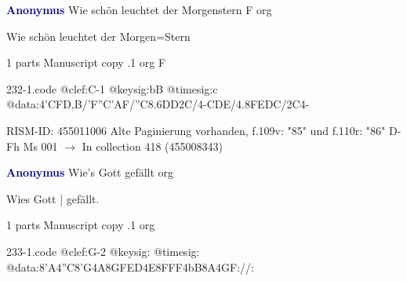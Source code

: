 \documentclass[twocolumn]{book}
\begin{document}
\newline \par \vspace{7pt} \textcolor{darkblue}{\textbf{Anonymus  }}
\newline Wie schön leuchtet der Morgenstern  F  
\newline org
\newline \begin{itshape}[f.109v, heading:] Wie schön leuchtet der Morgen=Stern\end{itshape} 
\newline \textcolor{darkblue}{}  1 parts  
\newline Manuscript copy
.1  org  F  
\begin{filecontents*}{232-1.code}
@clef:C-1
@keysig:bB
@timesig:c
@data:4'CFD,B/'F''C'AF/''C{8.6DD}2C/4-CDE/4.8FEDC/2C4-
\end{filecontents*}
\newline
%

\newline RISM-ID: 455011006
\newline Alte Paginierung vorhanden, f.109v: "85" und f.110r: "86"
\newline D-Fh  Ms 001
\newline $\rightarrow$ In collection 418 (455008343)

\newline \par \vspace{7pt} \textcolor{darkblue}{\textbf{Anonymus  }}
\newline Wie's Gott gefällt    
\newline org
\newline \begin{itshape}[f.30r, at left:] Wies Gott | gefällt.\end{itshape} 
\newline \textcolor{darkblue}{}  1 parts  
\newline Manuscript copy
.1  org  
\begin{filecontents*}{233-1.code}
@clef:G-2
@keysig:
@timesig:
@data:8'A4''C8'G4A8G{FE}D4E{8FFF}4bB8A4GF://:
\end{filecontents*}
\newline
%
\end{document}
